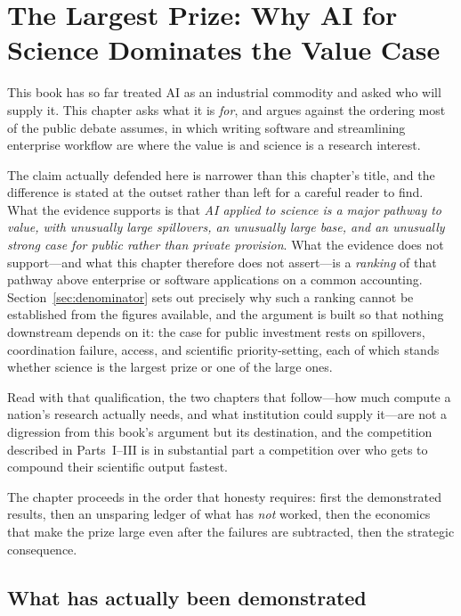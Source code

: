 \chapter{The Largest Prize: Why AI for Science Dominates the Value Case}
\label{ch:prize}

This book has so far treated AI as an industrial commodity and asked who will supply it. This chapter asks what it is \emph{for}, and argues against the ordering most of the public debate assumes, in which writing software and streamlining enterprise workflow are where the value is and science is a research interest.

The claim actually defended here is narrower than this chapter's title, and the difference is stated at the outset rather than left for a careful reader to find. What the evidence supports is that \emph{AI applied to science is a major pathway to value, with unusually large spillovers, an unusually large base, and an unusually strong case for public rather than private provision}. What the evidence does not support---and what this chapter therefore does not assert---is a \emph{ranking} of that pathway above enterprise or software applications on a common accounting. Section~\ref{sec:denominator} sets out precisely why such a ranking cannot be established from the figures available, and the argument is built so that nothing downstream depends on it: the case for public investment rests on spillovers, coordination failure, access, and scientific priority-setting, each of which stands whether science is the largest prize or one of the large ones.

Read with that qualification, the two chapters that follow---how much compute a nation's research actually needs, and what institution could supply it---are not a digression from this book's argument but its destination, and the competition described in Parts~I--III is in substantial part a competition over who gets to compound their scientific output fastest.

The chapter proceeds in the order that honesty requires: first the demonstrated results, then an unsparing ledger of what has \emph{not} worked, then the economics that make the prize large even after the failures are subtracted, then the strategic consequence.

\section{What has actually been demonstrated}

